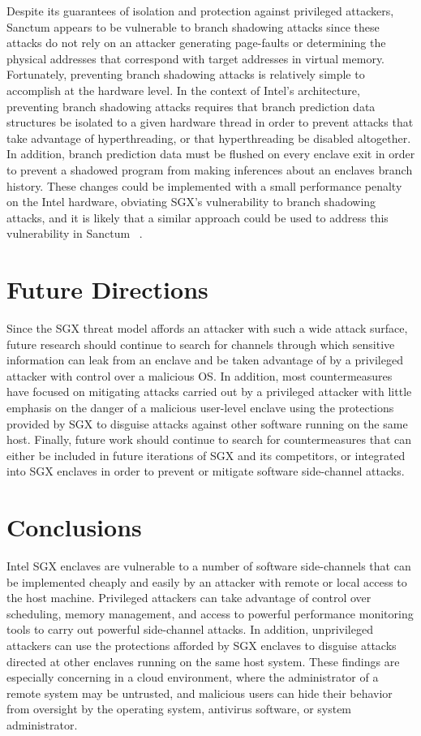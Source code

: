 Despite its guarantees of isolation and protection against privileged attackers, Sanctum appears to be vulnerable to branch shadowing attacks since these attacks do not rely on an attacker generating page-faults or determining the physical addresses that correspond with target addresses in virtual memory. Fortunately, preventing branch shadowing attacks is relatively simple to accomplish at the hardware level. In the context of Intel's architecture, preventing branch shadowing attacks requires that branch prediction data structures be isolated to a given hardware thread in order to prevent attacks that take advantage of hyperthreading, or that hyperthreading be disabled altogether. In addition, branch prediction data must be flushed on every enclave exit in order to prevent a shadowed program from making inferences about an enclaves branch history. These changes could be implemented with a small performance penalty on the Intel hardware, obviating SGX's vulnerability to branch shadowing attacks, and it is likely that a similar approach could be used to address this vulnerability in Sanctum ~\cite{costan_sanctum:_2016, costan_sanctum:_2015, lee_inferring_2017}.

\section{Future Directions}

Since the SGX threat model affords an attacker with such a wide attack surface, future research should continue to search for channels through which sensitive information can leak from an enclave and be taken advantage of by a privileged attacker with control over a malicious OS. In addition, most countermeasures have focused on mitigating attacks carried out by a privileged attacker with little emphasis on the danger of a malicious user-level enclave using the protections provided by SGX to disguise attacks against other software running on the same host. Finally, future work should continue to search for countermeasures that can either be included in future iterations of SGX and its competitors, or integrated into SGX enclaves in order to prevent or mitigate software side-channel attacks.

\section{Conclusions}

Intel SGX enclaves are vulnerable to a number of software side-channels that can be implemented cheaply and easily by an attacker with remote or local access to the host machine. Privileged attackers can take advantage of control over scheduling, memory management, and access to powerful performance monitoring tools to carry out powerful side-channel attacks. In addition, unprivileged attackers can use the protections afforded by SGX enclaves to disguise attacks directed at other enclaves running on the same host system. These findings are especially concerning in a cloud environment, where the administrator of a remote system may be untrusted, and malicious users can hide their behavior from oversight by the operating system, antivirus software, or system administrator. 

